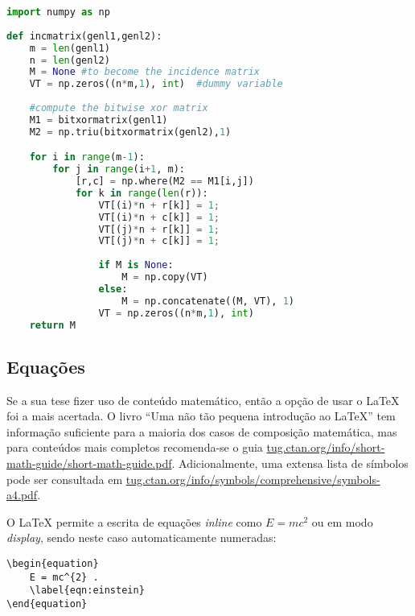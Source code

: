 \begin{minipage}{0.9\linewidth}
\begin{lstlisting}[language=Python, caption=Exemplo longo em Python., label=lst:examplo2]
import numpy as np
    
def incmatrix(genl1,genl2):
    m = len(genl1)
    n = len(genl2)
    M = None #to become the incidence matrix
    VT = np.zeros((n*m,1), int)  #dummy variable
    
    #compute the bitwise xor matrix
    M1 = bitxormatrix(genl1)
    M2 = np.triu(bitxormatrix(genl2),1) 

    for i in range(m-1):
        for j in range(i+1, m):
            [r,c] = np.where(M2 == M1[i,j])
            for k in range(len(r)):
                VT[(i)*n + r[k]] = 1;
                VT[(i)*n + c[k]] = 1;
                VT[(j)*n + r[k]] = 1;
                VT[(j)*n + c[k]] = 1;
                
                if M is None:
                    M = np.copy(VT)
                else:
                    M = np.concatenate((M, VT), 1)               
                VT = np.zeros((n*m,1), int)  
    return M
\end{lstlisting}
\end{minipage}


\subsection{Equações}

Se a sua tese fizer uso de conteúdo matemático, então a opção de usar o \LaTeX{} foi a mais acertada. O livro ``Uma não tão pequena introdução ao \LaTeX{}'' tem informação suficiente para a maioria dos casos de composição matemática, mas para conteúdos mais completos recomenda-se o guia \url{tug.ctan.org/info/short-math-guide/short-math-guide.pdf}. Adicionalmente, uma extensa lista de símbolos pode ser consultada em \url{tug.ctan.org/info/symbols/comprehensive/symbols-a4.pdf}.

O \LaTeX{} permite a escrita de equações \textit{inline} como $E = mc^{2}$ ou em modo \textit{display}, sendo neste caso  automaticamente numeradas:

\begin{verbatim}
\begin{equation}
	E = mc^{2} .
	\label{eqn:einstein}
\end{equation}
\end{verbatim}

